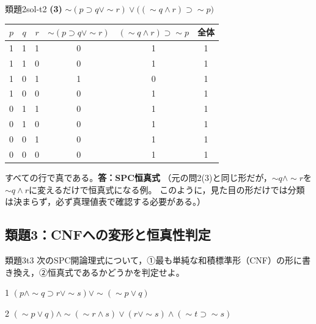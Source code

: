 \documentclass[autodetect-engine,dvi=dvipdfmx,ja=standard]{bxjsarticle}
\begin{document}
\begin{solution}{類題2}{sol-t2}
\textbf{(3)} \(\sim(p\supset q\lor\sim r)\lor\bigl((\sim q\land r)\supset\sim p\bigr)\)

\begin{center}
\begin{tabular}{ccc|c|c|c}
\toprule
\(p\) & \(q\) & \(r\) & \(\sim(p\supset q\lor\sim r)\) & \((\sim q\land r)\supset\sim p\) & 全体 \\
\midrule
1&1&1&0&1&1\\
1&1&0&0&1&1\\
1&0&1&1&0&1\\
1&0&0&0&1&1\\
0&1&1&0&1&1\\
0&1&0&0&1&1\\
0&0&1&0&1&1\\
0&0&0&0&1&1\\
\bottomrule
\end{tabular}
\end{center}
すべての行で真である。\textbf{答：SPC恒真式}
（元の問2(3)と同じ形だが，\(\sim q\land\sim r\)を\(\sim q\land r\)に変えるだけで恒真式になる例。
このように，見た目の形だけでは分類は決まらず，必ず真理値表で確認する必要がある。）
\end{solution}

\subsection*{類題3：CNFへの変形と恒真性判定}

\begin{exercise}{類題3}{t3}
次のSPC開論理式について，①最も単純な和積標準形（CNF）の形に書き換え，②恒真式であるかどうかを判定せよ。
\begin{pstep}{1}
  \((p\land\sim q\supset r\lor\sim s)\lor\sim(\sim p\lor q)\)
\end{pstep}
\begin{pstep}{2}
  \((\sim p\lor q)\land\sim(\sim r\land s)\lor(r\lor\sim s)\land(\sim t\supset\sim s)\)
\end{pstep}
\end{exercise}
\end{document}
